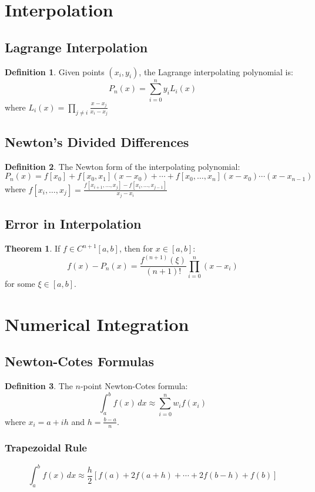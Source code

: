 \documentclass[11pt]{article}
\theoremstyle{definition}
\newtheorem{definition}{Definition}[section]
\newtheorem{theorem}{Theorem}[section]
\begin{document}
\section{Interpolation}

\subsection{Lagrange Interpolation}
\begin{definition}
Given points $(x_i, y_i)$, the Lagrange interpolating polynomial is:
$$P_n(x) = \sum_{i=0}^n y_i L_i(x)$$
where $L_i(x) = \prod_{j \neq i} \frac{x - x_j}{x_i - x_j}$
\end{definition}

\subsection{Newton's Divided Differences}
\begin{definition}
The Newton form of the interpolating polynomial:
$$P_n(x) = f[x_0] + f[x_0,x_1](x-x_0) + \cdots + f[x_0,\ldots,x_n](x-x_0)\cdots(x-x_{n-1})$$
where $f[x_i,\ldots,x_j] = \frac{f[x_{i+1},\ldots,x_j] - f[x_i,\ldots,x_{j-1}]}{x_j - x_i}$
\end{definition}

\subsection{Error in Interpolation}
\begin{theorem}
If $f \in C^{n+1}[a,b]$, then for $x \in [a,b]$:
$$f(x) - P_n(x) = \frac{f^{(n+1)}(\xi)}{(n+1)!} \prod_{i=0}^n (x - x_i)$$
for some $\xi \in [a,b]$.
\end{theorem}

\section{Numerical Integration}

\subsection{Newton-Cotes Formulas}
\begin{definition}
The $n$-point Newton-Cotes formula:
$$\int_a^b f(x) \, dx \approx \sum_{i=0}^n w_i f(x_i)$$
where $x_i = a + ih$ and $h = \frac{b-a}{n}$.
\end{definition}

\subsubsection{Trapezoidal Rule}
$$\int_a^b f(x) \, dx \approx \frac{h}{2}[f(a) + 2f(a+h) + \cdots + 2f(b-h) + f(b)]$$
\end{document}
